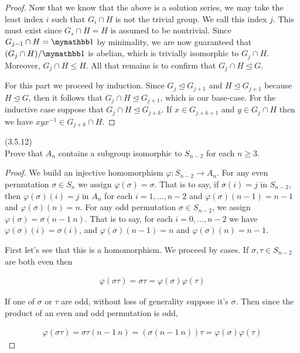 \documentclass{exam}
\begin{document}
\begin{questions}
\begin{proof}
  Now that we know that the above is a solution series, we may take the least index $i$ such that $G_i\cap H$ is not the trivial group.  We call this index $j$.  This must exist since $G_s\cap H = H$ is assumed to be nontrivial.  Since $G_{j-1}\cap H=\mymathbb 1$ by minimality, we are now guaranteed that $(G_j\cap H)/\mymathbb 1$ is abelian, which is trivially isomorphic to $G_j\cap H$.  Moreover, $G_j\cap H \leq H$. All that remains is to confirm that $G_j\cap H\trianglelefteq G$.

  For this part we proceed by induction.  Since $G_j\trianglelefteq G_{j+1}$ and $H\trianglelefteq G_{j+1}$ because $H\trianglelefteq G$, then it follows that $G_{j}\cap H\trianglelefteq G_{j+1}$, which is our base-case.  For the inductive case suppose that $G_j\cap H\trianglelefteq G_{j+k}$.  If $x\in G_{j+k+1}$ and $y\in G_j\cap H$ then we have $xyx^{-1}\in G_{j+k}\cap H$.
\end{proof}

\question(3.5.12)\\
Prove that $A_n$ contains a subgroup isomorphic to $S_{n-2}$ for each $n\geq 3$.

\begin{proof}
  We build an injective homomorphism $\varphi: S_{n-2}\rightarrow A_n$.  For any even permutation $\sigma\in S_n$ we assign $\varphi(\sigma)=\sigma$.  That is to say, if $\sigma(i)=j$ in $S_{n-2}$, then $\varphi(\sigma)(i)=j$ in $A_n$ for each $i=1,\dots,n-2$ and $\varphi(\sigma)(n-1)=n-1$ and $\varphi(\sigma)(n)=n$.  For any odd permutation $\sigma\in S_{n-2}$, we assign $\varphi(\sigma) = \sigma(n-1\ n)$.  That is to say, for each $i=0,\dots,n-2$ we have $\varphi(\sigma)(i) = \sigma(i)$, and $\varphi(\sigma)(n-1) = n$ and $\varphi(\sigma)(n)=n-1$.

  First let's see that this is a homomorphism.  We proceed by cases.  If $\sigma,\tau\in S_{n-2}$ are both even then

  \begin{align*}
    \varphi(\sigma\tau) = \sigma\tau = \varphi(\sigma)\varphi(\tau)
  \end{align*}

  If one of $\sigma$ or $\tau$ are odd, without loss of generality suppose it's $\sigma$.  Then since the product of an even and odd permutation is odd,

  \begin{align*}
    \varphi(\sigma\tau) = \sigma\tau(n-1\ n) = (\sigma(n-1\ n))\tau = \varphi(\sigma)\varphi(\tau)
  \end{align*}


\end{proof}
\end{questions}
\end{document}
